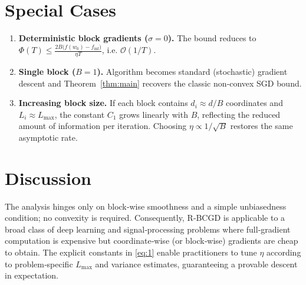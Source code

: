 \documentclass{article}
\begin{document}
\section*{Special Cases}
\begin{enumerate}[label=\arabic*)]
\item \textbf{Deterministic block gradients ($\sigma=0$).}  
The bound reduces to $\Phi(T)\le \frac{2B\big(f(w_0)-f_{\inf}\big)}{\eta T}$, i.e. $\mathcal{O}(1/T)$.

\item \textbf{Single block ($B=1$).}  
Algorithm becomes standard (stochastic) gradient descent and Theorem~\ref{thm:main} recovers the classic non‑convex SGD bound.

\item \textbf{Increasing block size.}  
If each block contains $d_i\approx d/B$ coordinates and $L_i\approx L_{\max}$, the constant $C_1$ grows linearly with $B$, reflecting the reduced amount of information per iteration. Choosing $\eta\propto 1/\sqrt{B}$ restores the same asymptotic rate.

\end{enumerate}

\section*{Discussion}
The analysis hinges only on block‑wise smoothness and a simple unbiasedness condition; no convexity is required. Consequently, R‑BCGD is applicable to a broad class of deep learning and signal‑processing problems where full‑gradient computation is expensive but coordinate‑wise (or block‑wise) gradients are cheap to obtain. The explicit constants in \eqref{eq:1} enable practitioners to tune $\eta$ according to problem‑specific $L_{\max}$ and variance estimates, guaranteeing a provable descent in expectation.
\end{document}
